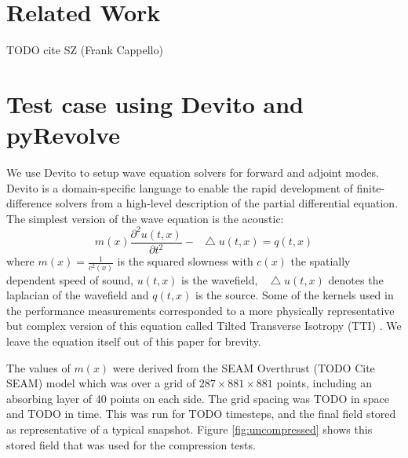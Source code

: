 \documentclass[conference]{IEEEtran}
\newcommand*\Laplace{\mathop{}\!\mathbin\bigtriangleup}
\begin{document}
\section{Related Work}
\cite{cyr2015towards}

\cite{dalmau2014lossy}

\cite{fichtner2009full}

\cite{gpu-compression}

\cite{boehm2016wavefield}
\cite{gpu-compression}
\cite{Kaklamanis:2012aa}

TODO cite SZ (Frank Cappello)
\section{Test case using Devito and pyRevolve}
We use Devito \cite{devito-compiler} \cite{devito-api} to setup wave equation solvers for forward and
adjoint modes. Devito is a domain-specific language to enable the rapid development of finite-difference
solvers from a high-level description of the partial differential equation. The simplest version of the wave
equation is the acoustic:
\begin{equation}
m(x)\frac{\partial^2 u(t, x)}{\partial t^2} - \Laplace u(t, x) = q(t, x)
\end{equation}
where $m(x) = \frac{1}{c^2(x)}$ is the squared slowness with $c(x)$ the spatially dependent speed of sound, 
$u(t, x)$ is the wavefield, $\Laplace u(t, x)$ denotes the laplacian of the wavefield and $q(t, x)$ is the source.
Some of the kernels used in the performance measurements corresponded to a more physically representative
but complex version of this equation called Tilted Transverse Isotropy (TTI) \cite{zhang2011stable}. We leave the 
equation itself out of this paper for brevity. 

The values of $m(x)$ were derived from the SEAM Overthrust (TODO Cite SEAM) model which was over a grid
of $287 \times 881 \times 881$ points, including an absorbing layer of 40 points on each side. The grid spacing
was TODO in space and TODO in time. This was run for TODO timesteps, and the final field stored as
representative of a typical snapshot. Figure \ref{fig:uncompressed} shows this stored field that was used for the compression tests. 
\end{document}
